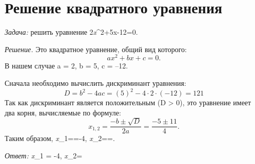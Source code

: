 \documentclass{article}
\title{}
\author{}
\date{}
\begin{document}
\maketitle

\section{Решение квадратного уравнения}
\textit{Задача:} решить уравнение 2\textit{x}^2+5x-12=0.
\par \textit{Решение.} Это квадратное уравнение, общий вид которого:
$$ ax^2+bx+c=0. $$
В нашем случае a = 2, b = 5, c = --12.
\par Сначала необходимо вычислить дискриминант уравнения:
$$D = b^2-4ac=(5)^2-4\cdot2\cdot(-12)=121$$
Так как дискриминант является положительным (D > 0), это уравнение имеет два корня, вычисляемые по формуле:
$$x_{1,2}=\frac{-b\pm\sqrt{D}}{2a}=\frac{-5\pm11}{4}.$$
Таким образом, \textit{x}_1==-4,  \textit{x}_2==.
\par \textit{Ответ: x}_1 = -4, \textit{x}_2=
\end{document}
